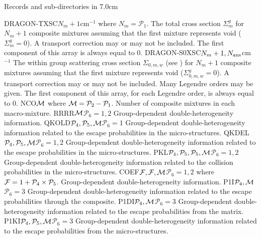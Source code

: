 \begin{DescriptionEnregistrement}{Records and sub-directories in }{7.0cm}

\RealEnr
  {DRAGON-TXSC}{$N_{m}+1$}{cm$^{-1}$}
  {where $N_{m}=\mathcal{P}_{1}$. The total cross section $\Sigma_{m}^{g}$ for $N_{m}+1$ composite mixtures assuming that the first mixture
   represents void ($\Sigma_{m}^{g}=0$). A transport correction may or may not
   be included. The first component of this array is always equal to 0.}
\RealEnr
  {DRAGON-S0XSC}{$N_{m}+1,N_{\rm ans}$}{cm$^{-1}$}
  {The within group scattering cross section $\Sigma_{0,m,w}$ (see )
   for $N_{m}+1$ composite mixtures assuming that the first mixture
   represents void ($\Sigma_{0,m,w}^{g}=0$). A transport correction may or may not
   be included. Many Legendre orders may be given. The first component of this
   array, for each Legendre order, is always equal to 0.}
\IntEnr
  {NCO}{${\cal M}$}
  {where ${\cal M}=\mathcal{P}_{2}-\mathcal{P}_{1}$. Number of composite mixtures in each macro-mixture.}
\OptRealEnr
  {RRRR}{${\cal M}$}{$\mathcal{P}_{6}=1,2$}{}
  {Group-dependent double-heterogeneity information.}
\OptRealEnr
  {QKOLD}{$\mathcal{P}_{4},\mathcal{P}_{5},{\cal M}$}{$\mathcal{P}_{6}=1$}{}
  {Group-dependent double-heterogeneity information related to the escape probabilities in the micro-structures.}
\OptRealEnr
  {QKDEL}{$\mathcal{P}_{4},\mathcal{P}_{5},{\cal M}$}{$\mathcal{P}_{6}=1,2$}{}
  {Group-dependent double-heterogeneity information related to the escape probabilities in the micro-structures.}
\OptRealEnr
  {PKL}{$\mathcal{P}_{4},\mathcal{P}_{5},\mathcal{P}_{5},{\cal M}$}{$\mathcal{P}_{6}=1,2$}{}
  {Group-dependent double-heterogeneity information related to the collision probabilities in the micro-structures.}
\OptDbleEnr
  {COEF}{${\cal F},{\cal F},{\cal M}$}{$\mathcal{P}_{6}=1,2$}{}
  {where ${\cal F}=1+\mathcal{P}_{4}\times\mathcal{P}_{5}$. Group-dependent double-heterogeneity information.}
\OptRealEnr
  {P1I}{$\mathcal{P}_{4},{\cal M}$}{$\mathcal{P}_{6}=3$}{}
  {Group-dependent double-heterogeneity information related to the escape probabilities through the composite.}
\OptRealEnr
  {P1DI}{$\mathcal{P}_{4},{\cal M}$}{$\mathcal{P}_{6}=3$}{}
  {Group-dependent double-heterogeneity information related to the escape probabilities from the matrix.}
\OptRealEnr
  {P1KI}{$\mathcal{P}_{4},\mathcal{P}_{5},{\cal M}$}{$\mathcal{P}_{6}=3$}{}
  {Group-dependent double-heterogeneity information related to the escape probabilities from the micro-structures.}

\end{DescriptionEnregistrement}
